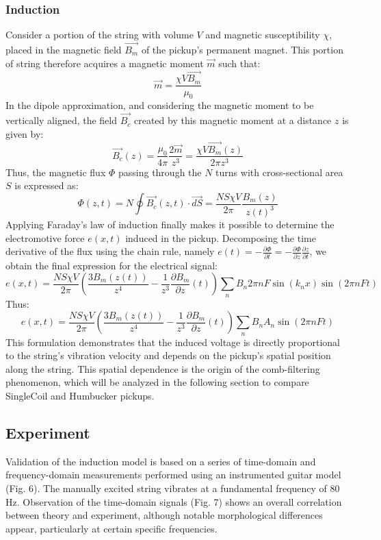 \documentclass[11pt, a4paper]{article}
\begin{document}
\subsubsection{Induction}
Consider a portion of the string with volume $V$ and magnetic susceptibility $\chi$, placed in the magnetic field $\vec{B_m}$ of the pickup's permanent magnet. This portion of string therefore acquires a magnetic moment $\vec{m}$ such that:
\begin{equation}
\vec{m} = \frac{\chi V \vec{B_m}}{\mu_0}
\end{equation}
In the dipole approximation, and considering the magnetic moment to be vertically aligned, the field $\vec{B_c}$ created by this magnetic moment at a distance $z$ is given by:
\begin{equation}
\vec{B_c}(z) = \frac{\mu_0}{4\pi} \frac{2\vec{m}}{z^3} = \frac{\chi V \vec{B_m}(z)}{2\pi z^3}
\end{equation}
Thus, the magnetic flux $\Phi$ passing through the $N$ turns with cross-sectional area $S$ is expressed as:
\begin{equation}
\Phi(z,t) = N \oint \vec{B_c}(z,t) \cdot \vec{dS} = \frac{N S \chi V}{2\pi} \frac{B_m(z)}{z(t)^3}
\end{equation}
Applying Faraday's law of induction finally makes it possible to determine the electromotive force $e(x,t)$ induced in the pickup. Decomposing the time derivative of the flux using the chain rule, namely $e(t) = -\frac{\partial\Phi}{\partial t} = -\frac{\partial\Phi}{\partial z}\frac{\partial z}{\partial t}$, we obtain the final expression for the electrical signal:
\begin{equation}
e(x,t) = \frac{N S \chi V}{2\pi} \left( \frac{3B_m(z(t))}{z^4} - \frac{1}{z^3} \frac{\partial B_m}{\partial z}(t) \right) \sum_{n} B_n 2\pi n F \sin(k_n x) \sin(2\pi n F t)
\end{equation}
Thus:
\begin{equation}
e(x,t) = \frac{N S \chi V}{2\pi} \left( \frac{3B_m(z(t))}{z^4} - \frac{1}{z^3} \frac{\partial B_m}{\partial z}(t) \right) \sum_{n} B_n A_n \sin(2\pi n F t)
\end{equation}
This formulation demonstrates that the induced voltage is directly proportional to the string's vibration velocity and depends on the pickup's spatial position along the string. This spatial dependence is the origin of the comb-filtering phenomenon, which will be analyzed in the following section to compare SingleCoil and Humbucker pickups.

\subsection{Experiment}
Validation of the induction model is based on a series of time-domain and frequency-domain measurements performed using an instrumented guitar model (Fig. 6). The manually excited string vibrates at a fundamental frequency of 80 Hz. Observation of the time-domain signals (Fig. 7) shows an overall correlation between theory and experiment, although notable morphological differences appear, particularly at certain specific frequencies.
\end{document}
